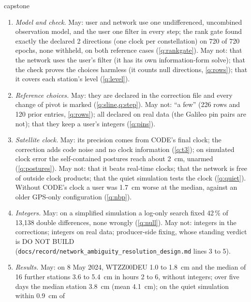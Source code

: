 \begin{answer}{capstone}
\solution
\begin{enumerate}[label=(\alph*), leftmargin=*, itemsep=2pt]
\item \emph{Model and check.} May: user and network use one undifferenced, uncombined
      observation model, and the user one filter in every step; the rank gate found
      exactly the declared 2 directions (one clock per constellation) on 720 of 720
      epochs, none withheld, on both reference cases (\cref{q:rankgate}). May not: that
      the network uses the user's filter (it has its own information-form solve); that
      the check proves the choices harmless (it counts null directions,
      \cref{q:rows}); that it covers each station's level (\cref{q:level}).
\item \emph{Reference choices.} May: they are declared in the correction file and
      every change of pivot is marked (\cref{q:sline,q:step}). May not: ``a few'' (226
      rows and 120 prior entries, \cref{q:rows}); all declared on real data (the
      Galileo pin pairs are not); that they keep a user's integers (\cref{q:pins}).
\item \emph{Satellite clock.} May: its precision comes from CODE's final clock; the
      correction adds code noise and no clock information (\cref{q:t3}); on simulated
      clock error the self-contained postures reach about 2~cm, unarmed
      (\cref{q:postures}). May not: that it beats real-time clocks; that the network is
      free of outside clock products; that the quiet simulation tests the clock
      (\cref{q:quiet}). Without CODE's clock a user was 1.7~cm worse at the median,
      against an older GPS-only configuration (\cref{q:nbp}).
\item \emph{Integers.} May: on a simplified simulation a log-only search fixed
      42\,\% of 13,138 double differences, none wrongly (\cref{q:null}). May not:
      integers in the corrections; integers on real data; producer-side fixing, whose
      standing verdict is DO NOT BUILD (\texttt{docs/record/network\_ambiguity\_resolution\_design.md}
      lines 3 to 5).
\item \emph{Results.} May: on 8 May 2024, WTZZ00DEU 1.0 to 1.8~cm and the median of 16
      further stations 3.6 to 5.4~cm in hours 2 to 6, without integers; over five days
      the median station 3.8~cm (mean 4.1~cm); on the quiet simulation within 0.9~cm of

\end{enumerate}
\end{answer}
